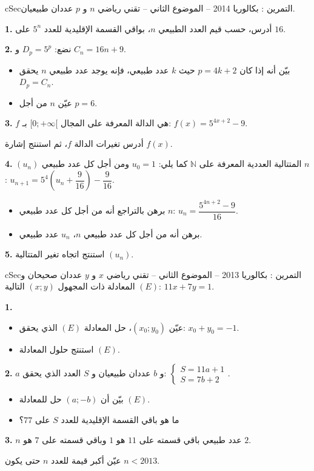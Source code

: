 \documentclass[12pt,a4paper]{article}
\newenvironment{BOX}[2]{\begin{otherlanguage}{english}\begin{arbox}{#1}{#2}}{\end{arbox}\end{otherlanguage}}
\newcounter{exo}
\newenvironment{tamrin}[1]{\stepcounter{exo}\begin{BOX}{cSec}{التمرين \theexo: #1}}{\end{BOX}}
\newcommand{\N}{\mathbb{N}}
\newenvironment{sq}{\begin{itemize}[leftmargin=2.4em,itemsep=3pt]}{\end{itemize}}
\newcommand{\qa}{\item[(أ)]}\newcommand{\qb}{\item[(ب)]}\newcommand{\qc}{\item[(جـ)]}\newcommand{\qd}{\item[(د)]}\newcommand{\qe}{\item[(هـ)]}
\begin{document}
\begin{tamrin}{بكالوريا 2014 -- الموضوع الثاني -- تقني رياضي}
$n$ و $p$ عددان طبيعيان.

\textbf{1.} أدرس، حسب قيم العدد الطبيعي $n$، بواقي القسمة الإقليدية للعدد $5^n$ على $16$.

\textbf{2.} نضع: $D_p=5^p$ و $C_n=16n+9$.
\begin{sq}
\qa بيّن أنه إذا كان $p=4k+2$ حيث $k$ عدد طبيعي، فإنه يوجد عدد طبيعي $n$ يحقق $D_p=C_n$.
\qb عيّن $n$ من أجل $p=6$.
\end{sq}

\textbf{3.} $f$ هي الدالة المعرفة على المجال $[0;+\infty[$ بـ: $f(x)=5^{4x+2}-9$.

أدرس تغيرات الدالة $f$، ثم استنتج إشارة $f(x)$.

\textbf{4.} $(u_n)$ المتتالية العددية المعرفة على $\N$ كما يلي: $u_0=1$ ومن أجل كل عدد طبيعي $n$:
$u_{n+1}=5^4\left(u_n+\dfrac{9}{16}\right)-\dfrac{9}{16}$.
\begin{sq}
\qa برهن بالتراجع أنه من أجل كل عدد طبيعي $n$: $u_n=\dfrac{5^{4n+2}-9}{16}$.
\qb برهن أنه من أجل كل عدد طبيعي $n$، $u_n$ عدد طبيعي.
\end{sq}

\textbf{5.} استنتج اتجاه تغير المتتالية $(u_n)$.
\end{tamrin}

\begin{tamrin}{بكالوريا 2013 -- الموضوع الثاني -- تقني رياضي}
$x$ و $y$ عددان صحيحان و $(E)$ المعادلة ذات المجهول $(x;y)$ التالية: $11x+7y=1$.

\textbf{1.}
\begin{sq}
\qa عيّن $(x_0;y_0)$، حل المعادلة $(E)$ الذي يحقق: $x_0+y_0=-1$.
\qb استنتج حلول المعادلة $(E)$.
\end{sq}

\textbf{2.} $a$ و $b$ عددان طبيعيان و $S$ العدد الذي يحقق: $\begin{cases}S=11a+1\\ S=7b+2\end{cases}$.
\begin{sq}
\qa بيّن أن $(a;-b)$ حل للمعادلة $(E)$.
\qb ما هو باقي القسمة الإقليدية للعدد $S$ على $77$؟
\end{sq}

\textbf{3.} $n$ عدد طبيعي باقي قسمته على $11$ هو $1$ وباقي قسمته على $7$ هو $2$.

عيّن أكبر قيمة للعدد $n$ حتى يكون $n<2013$.
\end{tamrin}
\end{document}
